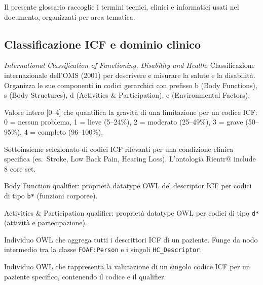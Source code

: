 \documentclass[a4paper,12pt]{article}
\begin{document}
Il presente glossario raccoglie i termini tecnici, clinici e informatici
usati nel documento, organizzati per area tematica.

\subsection*{Classificazione ICF e dominio clinico}

\begin{description}[leftmargin=4cm, labelwidth=3.8cm, labelsep=0.2cm]

\item[\textbf{ICF}]
  \textit{International Classification of Functioning, Disability and Health}.
  Classificazione internazionale dell'OMS (2001) per descrivere e misurare
  la salute e la disabilit\`{a}. Organizza le sue componenti in codici
  gerarchici con prefisso b (Body Functions), s (Body Structures),
  d (Activities \& Participation), e (Environmental Factors).

\item[\textbf{Qualifier ICF}]
  Valore intero [0--4] che quantifica la gravit\`{a} di una limitazione per
  un codice ICF: 0 = nessun problema, 1 = lieve (5--24\%), 2 = moderato
  (25--49\%), 3 = grave (50--95\%), 4 = completo (96--100\%).

\item[\textbf{ICF Core Set}]
  Sottoinsieme selezionato di codici ICF rilevanti per una condizione
  clinica specifica (es.\ Stroke, Low Back Pain, Hearing Loss). L'ontologia
  Rientr@ include 8 core set.

\item[\textbf{BFqual}]
  Body Function qualifier: propriet\`{a} datatype OWL del descriptor ICF
  per codici di tipo \texttt{b*} (funzioni corporee).

\item[\textbf{AP1qual}]
  Activities \& Participation qualifier: propriet\`{a} datatype OWL
  per codici di tipo \texttt{d*} (attivit\`{a} e partecipazione).

\item[\textbf{Health\_Condition (HC)}]
  Individuo OWL che aggrega tutti i descrittori ICF di un paziente.
  Funge da nodo intermedio tra la classe \texttt{FOAF:Person} e i
  singoli \texttt{HC\_Descriptor}.

\item[\textbf{HC\_Descriptor}]
  Individuo OWL che rappresenta la valutazione di un singolo codice ICF
  per un paziente specifico, contenendo il codice e il qualifier.


\end{description}
\end{document}
